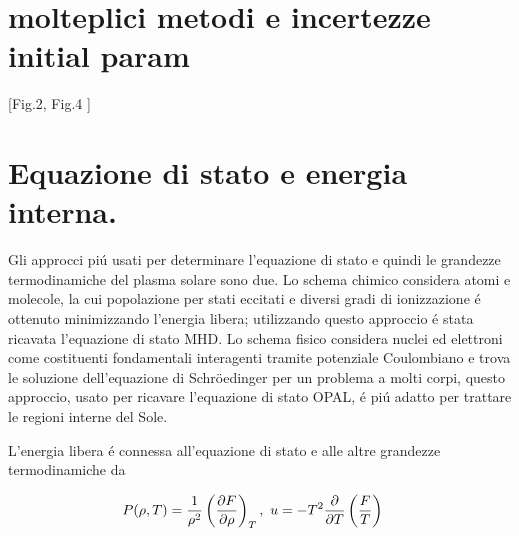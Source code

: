 \documentclass[../main.tex]{subfiles}
\begin{document}
\begin{comment}%
\begingroup
\renewcommand{\arraystretch}{1.3}
\begin{wraptable}{r}{6.5cm}
\begin{tabular}{|c|c|c|c|c|}
\hline
$Y_{in}$&$Y_{ph}$&$Z_{in}$&$\alpha$&$\frac{R_{cz}}{\rsun{}}$\\
\hline
0.27753&0.24695&0.02&2.09&0.712\\
\hline
\end{tabular}
\caption{Risultati modello solare. Da \cite{bahcall95diffusion}.}
\end{wraptable}
\endgroup
\end{comment}

\section{molteplici metodi e incertezze initial param}

\begin{workout}

[Fig.2, Fig.4 \cite{villante2014chemical}]

\end{workout}


\section{Equazione di stato e energia interna.}

\begin{errata}
Gli approcci pi\'u usati per determinare l'equazione di stato e quindi le grandezze termodinamiche del plasma solare sono due. Lo schema chimico considera atomi e molecole, la cui popolazione per stati eccitati e diversi gradi di ionizzazione \'e ottenuto minimizzando l'energia libera; utilizzando questo approccio \'e stata ricavata l'equazione di stato MHD. Lo schema fisico considera nuclei ed elettroni come costituenti fondamentali interagenti tramite potenziale Coulombiano e trova le soluzione dell'equazione di Schr\"oedinger per un problema a molti corpi, questo approccio, usato per ricavare l'equazione di stato OPAL, \'e pi\'u adatto per trattare le regioni interne del Sole.

L'energia libera \'e connessa all'equazione di stato e alle altre grandezze termodinamiche da

\begin{align}
&P(\rho,T)=\frac{1}{\rho^2}\Dcvar{\PDy{\rho}{F}}{T},\ u=-T^2\PDof{T}\left(\frac{F}{T}\right)
\end{align}

\end{errata}
\end{document}

